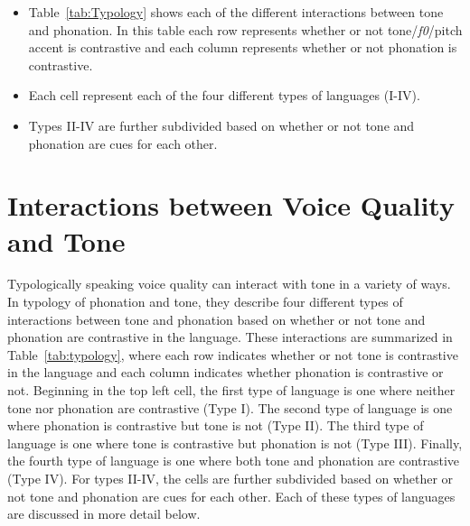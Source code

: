 \begin{itemize}
    \item Table~\ref{tab:Typology} shows each of the different interactions between tone and phonation. In this table each row represents whether or not tone/\textit{f0}/pitch accent is contrastive and each column represents whether or not phonation is contrastive. 
    \item Each cell represent each of the four different types of languages (I-IV). 
    \item Types II-IV are further subdivided based on whether or not tone and phonation are cues for each other. 
\end{itemize}

\section{Interactions between Voice Quality and Tone} \label{sec:interactions_between_voice_quality_and_tone}

Typologically speaking voice quality can interact with tone in a variety of ways. In  typology of phonation and tone, they describe four different types of interactions between tone and phonation based on whether or not tone and phonation are contrastive in the language. These interactions are summarized in Table~\ref{tab:typology}, where each row indicates whether or not tone is contrastive in the language and each column indicates whether phonation is contrastive or not. Beginning in the top left cell, the first type of language is one where neither tone nor phonation are contrastive (Type I). The second type of language is one where phonation is contrastive but tone is not (Type II). The third type of language is one where tone is contrastive but phonation is not (Type III). Finally, the fourth type of language is one where both tone and phonation are contrastive (Type IV). For types II-IV, the cells are further subdivided based on whether or not tone and phonation are cues for each other. Each of these types of languages are discussed in more detail below.


